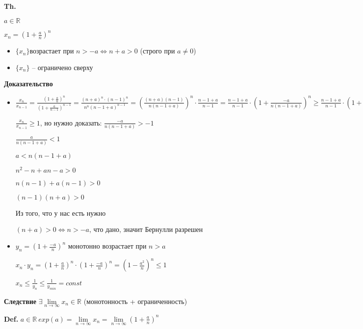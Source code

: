 \documentclass[14pt, letter paper]{article}
\begin{document}
\textbf{Th.}

$a \in \mathds{R}$

$x_n = (1 + \frac{a}{n})^n$

\begin{itemize}
    \item $\{x_n\}$возрастает при  $n > -a \Leftrightarrow n + a > 0$ (строго при $a \neq 0$)
    \item $\{x_n\}$ -- ограничено сверху
\end{itemize}

\begin{center}
    \textbf{Доказательство}
\end{center}

\begin{itemize}
    \item[Возрастание.] $\frac{x_n}{x_{n-1}} = \frac{(1 + \frac{a}{n})^n}{(1 + \frac{a}{n-1})^{n-1}} = \frac{(n + a)^n \cdot (n - 1)^n}{n^n(n - 1 + a)^{n-1}} = (\frac{(n+a)(n-1)}{n(n-1+a)})^n \cdot \frac{n-1+a}{n-1} = \frac{n-1+a}{n-1} \cdot (1 + \frac{-a}{n(n-1+a)})^n \geq \frac{n-1+a}{n-1} \cdot (1 + \frac{-a}{n(n+1-a)}) = \frac{n-1+a}{n-1} \cdot \frac{n-1+a-a}{n-1+a} = 1$

    $\frac{x_n}{x_{n-1}} \geq 1$, но нужно доказать: $\frac{-a}{n(n-1+a)} > -1$

    $\frac{a}{n(n-1+a)} < 1$

    $a < n(n-1+a)$

    $n^2 - n + an - a > 0$

    $n(n-1) + a(n-1) > 0$

    $(n-1)(n+a) > 0$

    Из того, что у нас есть нужно 

    $(n+a) > 0 \Leftrightarrow n > -a$, что дано, значит Бернулли разрешен

    \item[Ограниченность.] $y_n = (1 + \frac{-a}{n})^n$ монотонно возрастает при $n > a$

    $x_n \cdot y_n = (1 + \frac{a}{n})^n \cdot (1 + \frac{-a}{n})^n = (1 - \frac{a^2}{n})^n \leq 1$

    $x_n \leq \frac{1}{y_n} \leq \frac{1}{y_{min}} = const$
\end{itemize}

\textbf{Следствие} $\exists \lim\limits_{n \rightarrow \infty}{x_n} \in \mathds{R}$ (монотонность + ограниченность)

\textbf{Def.} $a \in \mathds{R}\ exp(a) = \lim\limits_{n \rightarrow \infty}{x_n} = \lim\limits_{n \rightarrow \infty}{(1 + \frac{a}{n})^n}$
\end{document}
